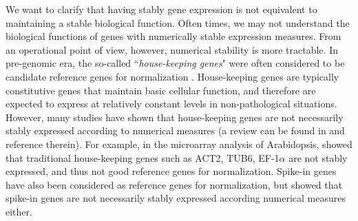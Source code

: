\documentclass[letterpaper,12pt]{article}
\begin{document}
We want to clarify that having stably gene expression is not
equivalent to maintaining a stable biological function.
Often times, we may not
understand the biological functions of genes with numerically stable
expression measures. From an operational point of view, however, numerical
stability is more tractable. In pre-genomic era, the so-called ``\textit{house-keeping
genes}" were often considered to be candidate reference genes for
normalization \citep{bustin2002quantification, andersen2004normalization}. House-keeping
genes are typically constitutive genes that
maintain basic cellular function, and therefore are expected to express at
relatively constant levels in non-pathological situations.  However, many
studies have shown that house-keeping
genes are not necessarily stably expressed according to
numerical measures (a review can be found in \cite{huggett2005real} and
reference therein).  For example, in the microarray analysis of Arabidopsis, \cite{czechowski2005genome}
showed that traditional house-keeping
genes such as ACT2, TUB6, EF-1$\alpha$ are not stably
expressed, and thus not good reference genes for normalization.  Spike-in
genes  have also been considered as reference genes for normalization, but %
\cite{risso2014nat} showed that spike-in genes are not necessarily stably
expressed according numerical measures either.  
\end{document}
